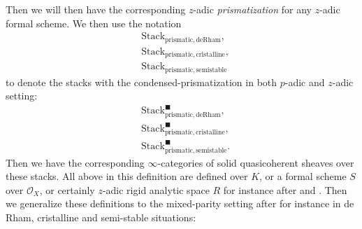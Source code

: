 \documentclass[12pt]{article}
\theoremstyle{definition}
\begin{document}
Then we will then have the corresponding $z$-adic \textit{prismatization} for any $z$-adic formal scheme. We then use the notation 
\begin{align}
&\mathrm{Stack}_{\mathrm{prismatic},\mathrm{deRham}},\\
&\mathrm{Stack}_{\mathrm{prismatic},\mathrm{cristalline}},\\
&\mathrm{Stack}_{\mathrm{prismatic},\mathrm{semistable}}
\end{align}
to denote the stacks with the condensed-prismatization in both $p$-adic and $z$-adic setting:
\begin{align}
&\mathrm{Stack}^\blacksquare_{\mathrm{prismatic},\mathrm{deRham}},\\&\mathrm{Stack}^\blacksquare_{\mathrm{prismatic},\mathrm{cristalline}},\\
&\mathrm{Stack}^\blacksquare_{\mathrm{prismatic},\mathrm{semistable}}.
\end{align}
Then we have the corresponding $\infty$-categories of solid quasicoherent sheaves over these stacks. All above in this definition are defined over $K$, or a formal scheme $S$ over $\mathcal{O}_X$, or certainly $z$-adic rigid analytic space $R$ for instance after \cite{SchD} and \cite{SALBRC}. Then we generalize these definitions to the mixed-parity setting after \cite{BS} for instance in de Rham, cristalline and semi-stable situations:
\end{document}
